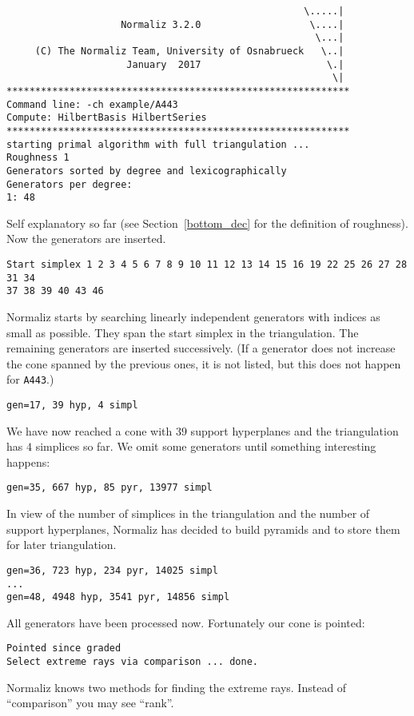 \begin{Verbatim}
                                                    \.....|
                    Normaliz 3.2.0                   \....|
                                                      \...|
     (C) The Normaliz Team, University of Osnabrueck   \..|
                     January  2017                      \.|
                                                         \|
************************************************************
Command line: -ch example/A443 
Compute: HilbertBasis HilbertSeries 
************************************************************
starting primal algorithm with full triangulation ...
Roughness 1
Generators sorted by degree and lexicographically
Generators per degree:
1: 48 
\end{Verbatim}
Self explanatory so far (see Section~\ref{bottom_dec} for the definition of roughness). Now the generators are inserted.
\begin{Verbatim}
Start simplex 1 2 3 4 5 6 7 8 9 10 11 12 13 14 15 16 19 22 25 26 27 28 31 34 
37 38 39 40 43 46 
\end{Verbatim}
Normaliz starts by searching linearly independent generators with indices as small as possible. They span the start simplex in the triangulation. The remaining generators are inserted successively. (If a generator does not increase the cone spanned by the previous ones, it is not listed, but this does not happen for \verb|A443|.)
\begin{Verbatim}
gen=17, 39 hyp, 4 simpl
\end{Verbatim}
We have now reached a cone with $39$ support hyperplanes and the triangulation has $4$ simplices so far. We omit some generators until something interesting happens:
\begin{Verbatim}
gen=35, 667 hyp, 85 pyr, 13977 simpl
\end{Verbatim}
In view of the number of simplices in the triangulation and the number of support hyperplanes, Normaliz has decided to build pyramids and to store them for later triangulation.
\begin{Verbatim}
gen=36, 723 hyp, 234 pyr, 14025 simpl
...
gen=48, 4948 hyp, 3541 pyr, 14856 simpl
\end{Verbatim}
All generators have been processed now. Fortunately our cone is pointed:
\begin{Verbatim}
Pointed since graded
Select extreme rays via comparison ... done.
\end{Verbatim}
Normaliz knows two methods for finding the extreme rays. Instead of ``comparison'' you may see ``rank''.

